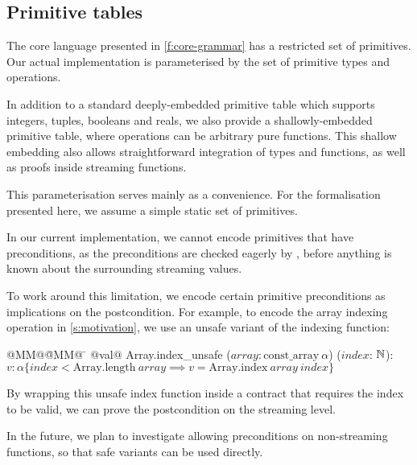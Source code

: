 \subsection{Primitive tables}
\label{s:core:primitive-tables}

The core language presented in \autoref{f:core-grammar} has a restricted set of primitives.
Our actual implementation is parameterised by the set of primitive types and operations.

In addition to a standard deeply-embedded primitive table which supports integers, tuples, booleans and reals, we also provide a shallowly-embedded primitive table, where operations can be arbitrary pure \fstar{} functions.
This shallow embedding also allows straightforward integration of \fstar{} types and functions, as well as proofs inside streaming functions.

This parameterisation serves mainly as a convenience.
For the formalisation presented here, we assume a simple static set of primitives.

In our current implementation, we cannot encode primitives that have preconditions, as the preconditions are checked eagerly by \fstar{}, before anything is known about the surrounding streaming values.

To work around this limitation, we encode certain primitive preconditions as implications on the postcondition.
For example, to encode the array indexing operation in \autoref{s:motivation}, we use an unsafe variant of the indexing function:
\begin{tabbing}
  @MM@\= @MM@ \= \kill
  @val@ Array.index_unsafe ($\textit{array}: \mbox{const_array}~\alpha$) ($\textit{index}$: $\mathbb{N}$): \\
  \> $v: \alpha \{ \textit{index} < \mbox{Array.length}~\textit{array} \implies v = \mbox{Array.index}~\textit{array}~\textit{index} \}$
\end{tabbing}

By wrapping this unsafe index function inside a contract that requires the index to be valid, we can prove the postcondition on the streaming level.

In the future, we plan to investigate allowing preconditions on non-streaming functions, so that safe variants can be used directly.
